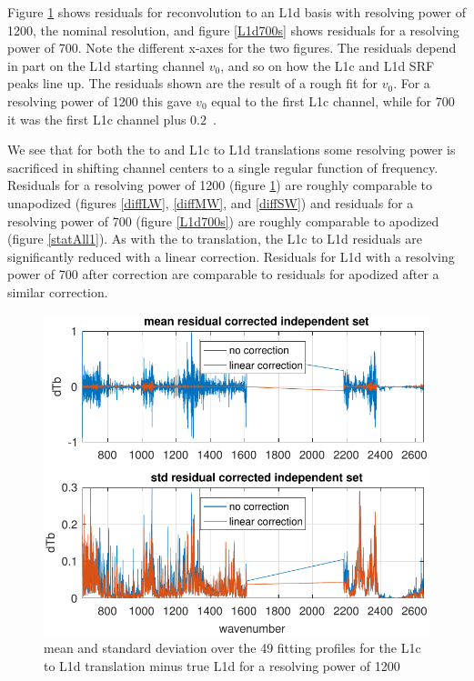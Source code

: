 \documentclass[10pt,twocolumn]{article}  %
\begin{document}
Figure \ref{L1d1200} shows residuals for reconvolution to an L1d
basis with resolving power of 1200, the nominal {\airs} resolution,
and figure \ref{L1d700s} shows residuals for a resolving power of
700.  Note the different x-axes for the two figures.  The residuals
depend in part on the L1d starting channel $v_0$, and so on how the
L1c and L1d SRF peaks line up.  The residuals shown are the result
of a rough fit for $v_0$.  For a resolving power of 1200 this gave
$v_0$ equal to the first L1c channel, while for 700 it was the first
L1c channel plus $0.2$~\wn.

We see that for both the {\airs} to {\cris} and L1c to L1d
translations some resolving power is sacrificed in shifting channel
centers to a single regular function of frequency.  Residuals for a
resolving power of 1200 (figure \ref{L1d1200}) are roughly
comparable to unapodized {\cris} (figures \ref{diffLW},
\ref{diffMW}, and \ref{diffSW}) and residuals for a resolving power
of 700 (figure \ref{L1d700s}) are roughly comparable to apodized
{\cris} (figure \ref{statAll1}).  As with the {\airs} to {\cris}
translation, the L1c to L1d residuals are significantly reduced with
a linear correction.  Residuals for L1d with a resolving power of
700 after correction are comparable to residuals for apodized
{\cris} after a similar correction.

\begin{figure} %
  \centering
  \includegraphics[width=\linewidth]{figures/L1d_cor1_1200.pdf}
  \caption{mean and standard deviation over the 49 fitting profiles
    for the L1c to L1d translation minus true L1d for a resolving
    power of 1200}
  \label{L1d1200}
\end{figure}
\end{document}
